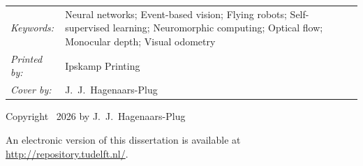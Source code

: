 \begin{titlepage}
\noindent
\begin{tabular}{@{}p{}@{}p{}}
\textit{Keywords:} & Neural networks; Event-based vision; Flying robots; Self-supervised learning; Neuromorphic computing; Optical flow; Monocular depth; Visual odometry \\[\medskipamount]
\textit{Printed by:} & Ipskamp Printing \\[\medskipamount]
\textit{Cover by:} & J.\ J.\ Hagenaars-Plug
\end{tabular}

\vspace{4\bigskipamount}

\noindent Copyright \textcopyright\ 2026 by J.\ J.\ Hagenaars-Plug


\medskip

\medskip
{}
\noindent An electronic version of this dissertation is available at \\
\url{http://repository.tudelft.nl/}.

\end{titlepage}

